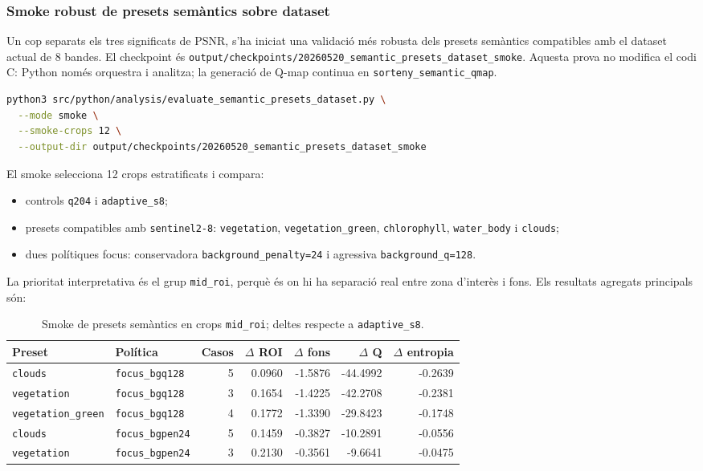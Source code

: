 \documentclass[11pt,a4paper]{article}
\begin{document}
\subsubsection{Smoke robust de presets semàntics sobre dataset}

Un cop separats els tres significats de PSNR, s'ha iniciat una validació més robusta dels presets semàntics compatibles amb el dataset actual de 8 bandes. El checkpoint és \texttt{output/checkpoints/20260520\_semantic\_presets\_dataset\_smoke}. Aquesta prova no modifica el codi C: Python només orquestra i analitza; la generació de Q-map continua en \texttt{sorteny\_semantic\_qmap}.

\begin{lstlisting}[language=bash]
python3 src/python/analysis/evaluate_semantic_presets_dataset.py \
  --mode smoke \
  --smoke-crops 12 \
  --output-dir output/checkpoints/20260520_semantic_presets_dataset_smoke
\end{lstlisting}

El smoke selecciona 12 crops estratificats i compara:
\begin{itemize}
  \item controls \texttt{q204} i \texttt{adaptive\_s8};
  \item presets compatibles amb \texttt{sentinel2-8}: \texttt{vegetation}, \texttt{vegetation\_green}, \texttt{chlorophyll}, \texttt{water\_body} i \texttt{clouds};
  \item dues polítiques focus: conservadora \texttt{background\_penalty=24} i agressiva \texttt{background\_q=128}.
\end{itemize}

La prioritat interpretativa és el grup \texttt{mid\_roi}, perquè és on hi ha separació real entre zona d'interès i fons. Els resultats agregats principals són:

\begin{table}[H]
\centering
\begin{tabular}{llrrrrr}
\toprule
\textbf{Preset} & \textbf{Política} & \textbf{Casos} & \textbf{$\Delta$ ROI} & \textbf{$\Delta$ fons} & \textbf{$\Delta$ Q} & \textbf{$\Delta$ entropia} \\
\midrule
\texttt{clouds} & \texttt{focus\_bgq128} & 5 & 0.0960 & -1.5876 & -44.4992 & -0.2639 \\
\texttt{vegetation} & \texttt{focus\_bgq128} & 3 & 0.1654 & -1.4225 & -42.2708 & -0.2381 \\
\texttt{vegetation\_green} & \texttt{focus\_bgq128} & 4 & 0.1772 & -1.3390 & -29.8423 & -0.1748 \\
\texttt{clouds} & \texttt{focus\_bgpen24} & 5 & 0.1459 & -0.3827 & -10.2891 & -0.0556 \\
\texttt{vegetation} & \texttt{focus\_bgpen24} & 3 & 0.2130 & -0.3561 & -9.6641 & -0.0475 \\
\bottomrule
\end{tabular}
\caption{Smoke de presets semàntics en crops \texttt{mid\_roi}; deltes respecte a \texttt{adaptive\_s8}.}
\end{table}
\end{document}
